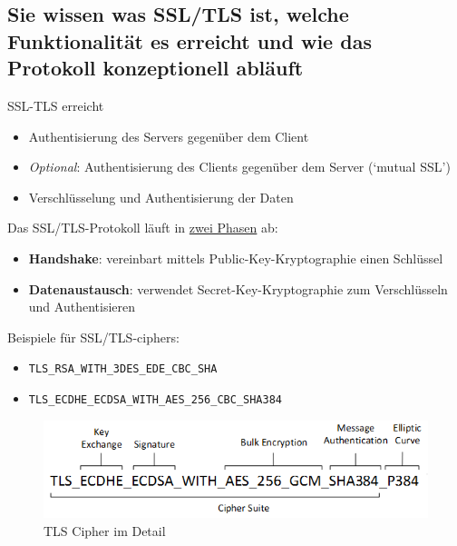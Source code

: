 \documentclass[10pt,a4paper]{article}
\begin{document}
\subsection*{Sie wissen was SSL/TLS ist, welche Funktionalität es erreicht und wie das Protokoll konzeptionell abläuft}SSL-TLS erreicht
\begin{itemize}[noitemsep,topsep=0pt,leftmargin=*]
    \item Authentisierung des Servers gegenüber dem Client
    \item \textsl{Optional}: Authentisierung des Clients gegenüber dem Server (`mutual SSL')
    \item Verschlüsselung und Authentisierung der Daten
\end{itemize}
Das SSL/TLS-Protokoll läuft in \underline{zwei Phasen} ab:
\begin{itemize}[noitemsep,topsep=0pt,leftmargin=*]
    \item \textbf{Handshake}: vereinbart mittels Public-Key-Kryptographie einen Schlüssel
    \item \textbf{Datenaustausch}: verwendet Secret-Key-Kryptographie zum Verschlüsseln und Authentisieren
\end{itemize}
Beispiele für SSL/TLS-ciphers:
\begin{itemize}[noitemsep,topsep=0pt,leftmargin=*]
    \item \verb|TLS_RSA_WITH_3DES_EDE_CBC_SHA|
    \item \verb|TLS_ECDHE_ECDSA_WITH_AES_256_CBC_SHA384|
\end{itemize}

\begin{figure}[H]
    \begin{center}
    \includegraphics[width=12cm]{images/ciphersuite.png}
    \caption{TLS Cipher im Detail}
    \label{ciphersuite}
    \end{center}
\end{figure}
\end{document}
